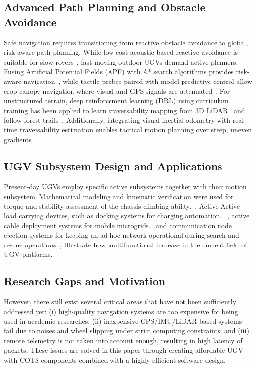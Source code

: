 \documentclass[runningheads]{llncs}
\begin{document}
\subsection{Advanced Path Planning and Obstacle Avoidance}

Safe navigation requires transitioning from reactive obstacle avoidance to global, risk-aware path planning. While low-cost acoustic-based reactive avoidance is suitable for slow rovers~\cite{desimone2018obstacle}, fast-moving outdoor UGVs demand active planners. Fusing Artificial Potential Fields (APF) with A* search algorithms provides risk-aware navigation~\cite{jiang2024risk}, while tactile probes paired with model predictive control allow crop-canopy navigation where visual and GPS signals are attenuated~\cite{gronewold2025tactile}. For unstructured terrain, deep reinforcement learning (DRL) using curriculum training has been applied to learn traversability mapping from 3D LiDAR~\cite{sanchez2023reinforcement} and follow forest trails~\cite{tibermacine2026autonomous}. Additionally, integrating visual-inertial odometry with real-time traversability estimation enables tactical motion planning over steep, uneven gradients~\cite{mukherjee2025terrain}.

\subsection{UGV Subsystem Design and Applications}

Present-day UGVs employ specific active subsystems together with their motion subsystem. Mathematical modeling and kinematic verification were used for torque and stability assessment of the chassis climbing ability.~\cite{dolya2025development}. Active Active load carrying devices, such as docking systems for charging automation.
~\cite{jung2026autonomous}, active cable deployment systems for mobile microgrids.~\cite{naglak2021cable},and communication node ejection systems for keeping an ad-hoc network operational during search and rescue operations~\cite{fisher2025developing}, Illustrate how multifunctional increase in the current field  of UGV platforms.

\subsection{Research Gaps and Motivation}

However, there still exist several critical areas that have not been sufficiently addressed yet: (i) high-quality navigation systems are too expensive for being used in academic researches; (ii) inexpensive GPS/IMU/LiDAR-based systems fail due to noises and wheel slipping under strict computing constraints; and (iii) remote telemetry is not taken into account enough, resulting in high latency of packets. These issues are solved in this paper through creating affordable UGV with COTS components combined with a highly-efficient software design.
\end{document}
